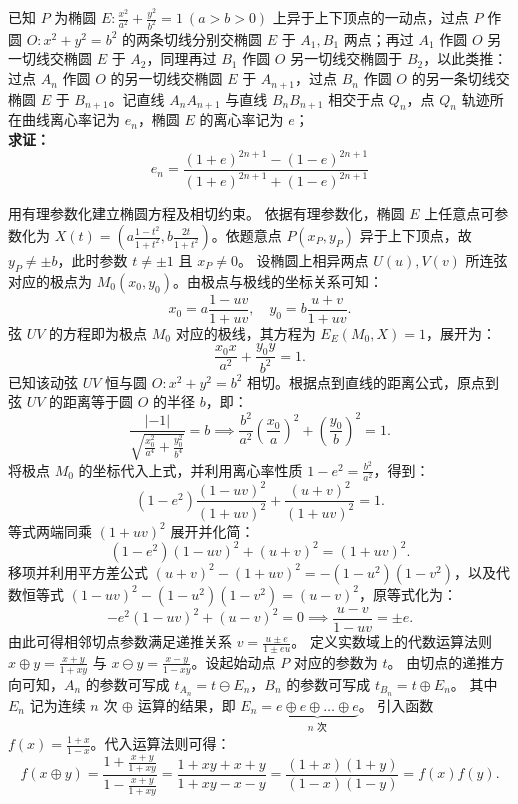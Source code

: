 \begin{exercise}
已知 $P$ 为椭圆 $E: \frac{x^2}{a^2} + \frac{y^2}{b^2} = 1\ (a > b > 0)$ 上异于上下顶点的一动点，过点 $P$ 作圆 $O: x^2 + y^2 = b^2$ 的两条切线分别交椭圆 $E$ 于 $A_1,B_1$ 两点；再过 $A_1$ 作圆 $O$ 另一切线交椭圆 $E$ 于 $A_2$，同理再过 $B_1$ 作圆 $O$ 另一切线交椭圆于 $B_2$，以此类推：过点 $A_n$ 作圆 $O$ 的另一切线交椭圆 $E$ 于 $A_{n+1}$，过点 $B_n$ 作圆 $O$ 的另一条切线交椭圆 $E$ 于 $B_{n+1}$。记直线 $A_nA_{n+1}$ 与直线 $B_nB_{n+1}$ 相交于点 $Q_n$，点 $Q_n$ 轨迹所在曲线离心率记为 $e_n$，椭圆 $E$ 的离心率记为 $e$；\\
\textbf{求证：}
\[
e_n = \frac{(1+e)^{2n+1} - (1-e)^{2n+1}}{(1+e)^{2n+1} + (1-e)^{2n+1}}
\]
\end{exercise}
\begin{solution}
用有理参数化建立椭圆方程及相切约束。
依据有理参数化，椭圆 $E$ 上任意点可参数化为 $X(t) = \left( a\frac{1-t^2}{1+t^2}, b\frac{2t}{1+t^2} \right)$。依题意点 $P(x_P, y_P)$ 异于上下顶点，故 $y_P \neq \pm b$，此时参数 $t \neq \pm 1$ 且 $x_P \neq 0$。
设椭圆上相异两点 $U(u), V(v)$ 所连弦对应的极点为 $M_0(x_0, y_0)$。由极点与极线的坐标关系可知：
\[ x_0 = a\frac{1-uv}{1+uv}, \quad y_0 = b\frac{u+v}{1+uv}. \]
弦 $UV$ 的方程即为极点 $M_0$ 对应的极线，其方程为 $E_E(M_0, X) = 1$，展开为：
\[ \frac{x_0 x}{a^2} + \frac{y_0 y}{b^2} = 1. \]
已知该动弦 $UV$ 恒与圆 $O: x^2 + y^2 = b^2$ 相切。根据点到直线的距离公式，原点到弦 $UV$ 的距离等于圆 $O$ 的半径 $b$，即：
\[ \frac{|-1|}{\sqrt{\frac{x_0^2}{a^4} + \frac{y_0^2}{b^4}}} = b \implies \frac{b^2}{a^2} \left(\frac{x_0}{a}\right)^2 + \left(\frac{y_0}{b}\right)^2 = 1. \]
将极点 $M_0$ 的坐标代入上式，并利用离心率性质 $1-e^2 = \frac{b^2}{a^2}$，得到：
\[ (1-e^2)\frac{(1-u v)^2}{(1+u v)^2} + \frac{(u+v)^2}{(1+u v)^2} = 1. \]
等式两端同乘 $(1+u v)^2$ 展开并化简：
\[ (1-e^2)(1-u v)^2 + (u+v)^2 = (1+u v)^2. \]
移项并利用平方差公式 $(u+v)^2 - (1+u v)^2 = -(1-u^2)(1-v^2)$，以及代数恒等式 $(1-u v)^2 - (1-u^2)(1-v^2) = (u-v)^2$，原等式化为：
\[ -e^2(1-u v)^2 + (u-v)^2 = 0 \implies \frac{u - v}{1 - u v} = \pm e. \]
由此可得相邻切点参数满足递推关系 $v = \frac{u \pm e}{1 \pm e u}$。
定义实数域上的代数运算法则 $x \oplus y = \frac{x+y}{1+xy}$ 与 $x \ominus y = \frac{x-y}{1-xy}$。设起始动点 $P$ 对应的参数为 $t$。
由切点的递推方向可知，$A_n$ 的参数可写成 $t_{A_n} = t \ominus E_n$，$B_n$ 的参数可写成 $t_{B_n} = t \oplus E_n$。
其中 $E_n$ 记为连续 $n$ 次 $\oplus$ 运算的结果，即 $E_n = \underbrace{e \oplus e \oplus \dots \oplus e}_{n \text{ 次}}$。
引入函数 $f(x) = \frac{1+x}{1-x}$。代入运算法则可得：
\[ f(x \oplus y) = \frac{1 + \frac{x+y}{1+xy}}{1 - \frac{x+y}{1+xy}} = \frac{1+xy+x+y}{1+xy-x-y} = \frac{(1+x)(1+y)}{(1-x)(1-y)} = f(x)f(y). \]

\end{solution}
